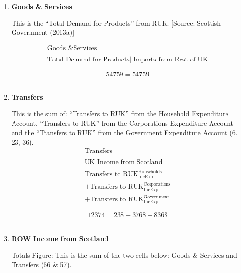 \begin{enumerate}
\item \textbf {Goods \& Services}

This is the “Total Demand for Products” from RUK. [Source: Scottish Government (2013a)]

\begin{equation}
\begin{split}
\text{Goods \& Services} =  \\ \\
\text{Total Demand for Products}\|\text{Imports from Rest of UK}
\end{split} \label{eq:2.5.56}
\end{equation}

\begin{equation} \nonumber
54759 = 54759
\end{equation}\\


\item \textbf {Transfers}

This is the sum of: “Transfers to RUK” from the Household Expenditure Account, “Transfers to RUK” from the Corporations Expenditure Account and the “Transfers to RUK” from the Government Expenditure Account (6, 23, 36).\\

\begin{equation}
\begin{split}
\text{Transfers} =  \\ \\
\text{UK Income from Scotland} =  \\ \\
\text{Transfers to RUK}^\text{Households}_\text{IncExp}\\
+\text{Transfers to RUK}^\text{Corporations}_\text{IncExp}\\
+\text{Transfers to RUK}^\text{Government}_\text{IncExp}
\end{split} \label{eq:2.5.57}
\end{equation}

\begin{equation} \nonumber
12374 = 238+3768+8368
\end{equation}\\


\item \textbf {ROW Income from Scotland}

Totals Figure: This is the sum of the two cells below: Goods \& Services and Transfers (56 \& 57).\\


\end{enumerate}
